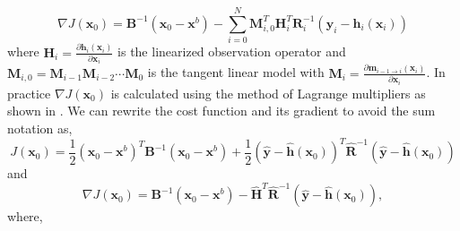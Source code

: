 \begin{equation}
\nabla J(\textbf{x}_0) = \textbf{B}^{-1}(\textbf{x}_0-\textbf{x}^{b})-\sum_{i=0}^{N}\textbf{M}_{i,0}^{T}\textbf{H}_i^{T}\textbf{R}_{i}^{-1}(\textbf{y}_i-\textbf{h}_i(\textbf{x}_i))
\end{equation}
where $\textbf{H}_i = \frac{\partial \textbf{h}_i(\textbf{x}_i)}{\partial\textbf{x}_i}$ is the linearized observation operator and $\mathbf{M}_{i,0}=\mathbf{M}_{i-1}\mathbf{M}_{i-2}\cdots\mathbf{M}_0$ is the tangent linear model with $\mathbf{M}_i=\frac{\partial \textbf{m}_{i-1\rightarrow i}(\textbf{x}_{i})}{\partial \textbf{x}_{i}}$. In practice $\nabla J(\textbf{x}_0)$ is calculated using the method of Lagrange multipliers as shown in \citet{lawless2013}. We can rewrite the cost function and its gradient to avoid the sum notation as,
\begin{equation}
J(\textbf{x}_0) = \frac{1}{2}(\textbf{x}_0-\textbf{x}^b)^{T}\textbf{B}^{-1}(\textbf{x}_0-\textbf{x}^b)+\frac{1}{2}(\hat{\textbf{y}}-\hat{\textbf{h}}(\textbf{x}_0))^{T}\hat{\textbf{R}}^{-1}(\hat{\textbf{y}}-\hat{\textbf{h}}(\textbf{x}_0)) \label{chap6:costfn}
\end{equation}
and
\begin{equation}
\nabla J(\textbf{x}_0) = \textbf{B}^{-1}(\textbf{x}_0-\textbf{x}^b)-\hat{\mathbf{H}}^{T}\hat{\textbf{R}}^{-1}(\hat{\textbf{y}}-\hat{\textbf{h}}(\textbf{x}_0)), \label{chap6:gradcostfn}
\end{equation}
where,

